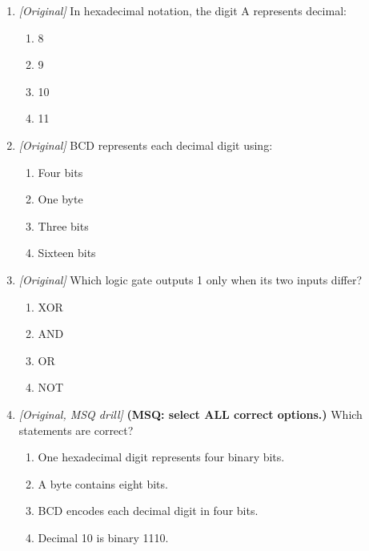 \begin{enumerate}[label=\textbf{Q\arabic*.}, leftmargin=*]
\item \textit{[Original]} In hexadecimal notation, the digit A represents decimal:
  \begin{enumerate}[label=\Alph*.]
\item 8
   \item 9
   \item 10
   \item 11
  \end{enumerate}

\item \textit{[Original]} BCD represents each decimal digit using:
  \begin{enumerate}[label=\Alph*.]
\item Four bits
   \item One byte
   \item Three bits
   \item Sixteen bits
  \end{enumerate}

\item \textit{[Original]} Which logic gate outputs 1 only when its two inputs differ?
  \begin{enumerate}[label=\Alph*.]
\item XOR
   \item AND
   \item OR
   \item NOT
  \end{enumerate}

\item \textit{[Original, MSQ drill]} \textbf{(MSQ: select ALL correct options.)} Which statements are correct?
  \begin{enumerate}[label=\Alph*.]
\item One hexadecimal digit represents four binary bits.
   \item A byte contains eight bits.
   \item BCD encodes each decimal digit in four bits.
   \item Decimal 10 is binary 1110.
  \end{enumerate}

\end{enumerate}
